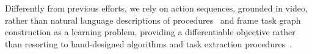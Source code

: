 Differently from previous efforts, we rely on action sequences, grounded in video, rather than natural language descriptions of procedures~\cite{dvornik2022graph2vid,sakaguchi2021proscript} and frame task graph construction as a learning problem, providing a differentiable objective rather than resorting to hand-designed algorithms and task extraction procedures~\cite{ashutosh2024video,zhou2023procedure,sohn2020meta,jang2023multimodal}.